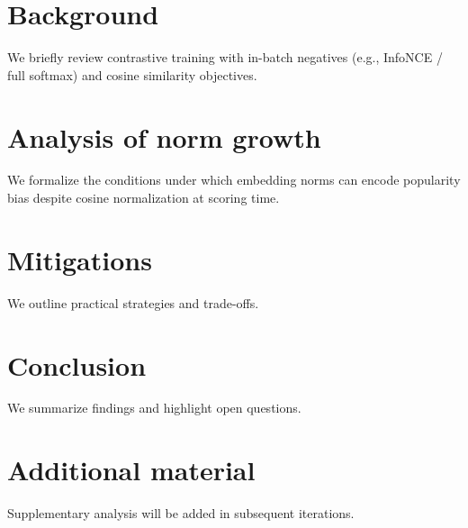 \documentclass{article}
\begin{document}

\printAffiliationsAndNotice{\mlsysEqualContribution}



\section{Background}
We briefly review contrastive training with in-batch negatives (e.g., InfoNCE / full softmax) and cosine similarity objectives.

\section{Analysis of norm growth}
We formalize the conditions under which embedding norms can encode popularity bias despite cosine normalization at scoring time.

\section{Mitigations}
We outline practical strategies and trade-offs.

\section{Conclusion}
We summarize findings and highlight open questions.




\appendix
\section{Additional material}
Supplementary analysis will be added in subsequent iterations.
\end{document}

